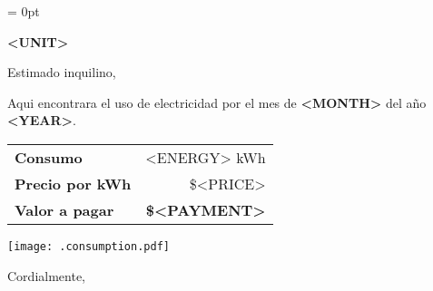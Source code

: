 \documentclass{letter}
\makeatletter
\renewcommand{\closing}[1]{\par\nobreak\vspace{\parskip}
    \stopbreaks
    \noindent
    \ifx\@empty\fromaddress\else
    \hspace*{\longindentation}\fi
    \parbox{2\indentedwidth}{\raggedright
        \ignorespaces #1\\[6\medskipamount]
        \ifx\@empty\fromsig
            \fromname
        \else \fromsig \fi\strut}
    \par}
\makeatother
\begin{document}
    \signature
    {
        \vspace{-3.0em}
        Management
    }
    \longindentation = 0pt
    \let\raggedleft\raggedright

    \begin{letter}{}
        \begin{flushright}
            \hfill {\large\bf <UNIT>} \\
        \end{flushright} 

        \vspace{1.0em}

        Estimado inquilino,

        Aqui encontrara el uso de electricidad por el mes de \textbf{<MONTH>} del año \textbf{<YEAR>}.

        \setlength{\tabcolsep}{10pt}
        \renewcommand{\arraystretch}{1.2}
        \begin{tabular}{lr}
            \textbf{Consumo}        & <ENERGY> kWh \\
            \textbf{Precio por kWh} & \$<PRICE> \\ \hline
            \textbf{Valor a pagar}  & \textbf{\$<PAYMENT>}
        \end{tabular}

        \begin{center}
            \texttt{[image: .consumption.pdf]}
        \end{center}


        \closing{Cordialmente,}
    \end{letter}
\end{document}
